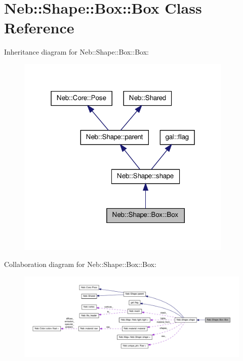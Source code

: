 \hypertarget{classNeb_1_1Shape_1_1Box_1_1Box}{\section{\-Neb\-:\-:\-Shape\-:\-:\-Box\-:\-:\-Box \-Class \-Reference}
\label{classNeb_1_1Shape_1_1Box_1_1Box}
}


\-Inheritance diagram for \-Neb\-:\-:\-Shape\-:\-:\-Box\-:\-:\-Box\-:
\nopagebreak
\begin{figure}[H]
\begin{center}
\leavevmode
\includegraphics[width=292pt]{classNeb_1_1Shape_1_1Box_1_1Box__inherit__graph}
\end{center}
\end{figure}


\-Collaboration diagram for \-Neb\-:\-:\-Shape\-:\-:\-Box\-:\-:\-Box\-:
\nopagebreak
\begin{figure}[H]
\begin{center}
\leavevmode
\includegraphics[width=350pt]{classNeb_1_1Shape_1_1Box_1_1Box__coll__graph}
\end{center}
\end{figure}

